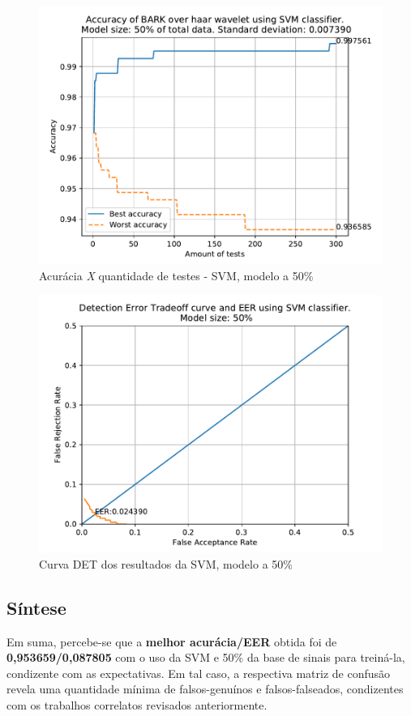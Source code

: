 			\begin{figure}[H]
				\centering
				\includegraphics[width=.9\linewidth]{images/results/confusionMatrices/classifier_SVM_50}
				\caption{Acurácia \textit{X} quantidade de testes - SVM, modelo a 50\%}
				\label{fig:classifiersvm50}
			\end{figure}
		
			\begin{figure}[H]
				\centering
				\includegraphics[width=.9\linewidth]{images/results/det/DET_for_classifier_SVM_50}
				\caption{Curva DET dos resultados da SVM, modelo a 50\%}
				\label{fig:detsvm50}
			\end{figure}

		\subsection{Síntese}
   			\par Em suma, percebe-se que a \textbf{melhor acurácia/EER} obtida foi de \textbf{0,953659/0,087805} com o uso da SVM e 50\% da base de sinais para treiná-la, condizente com as expectativas. Em tal caso, a respectiva matriz de confusão revela uma quantidade mínima de falsos-genuínos e falsos-falseados, condizentes com os trabalhos correlatos revisados anteriormente.

